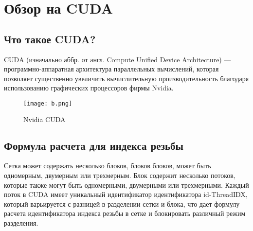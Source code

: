 \documentclass[a4paper, 12pt]{report}
\begin{document}

    \chapter{Обзор на CUDA}
    \section{Что такое CUDA?}
	
    CUDA (изначально аббр. от англ. Compute Unified Device Architecture) — программно-аппаратная архитектура параллельных вычислений, которая позволяет существенно увеличить вычислительную производительность благодаря использованию графических процессоров фирмы Nvidia. \cite{sanders2010cuda}
    \begin{figure}[h!]
	\centering
	\texttt{[image: b.png]}
	\caption{Nvidia CUDA}
	\label{}
    \end{figure}
    \section{Формула расчета для индекса резьбы}
    Сетка может содержать несколько блоков, блоков блоков, может быть одномерным, двумерным или трехмерным. Блок содержит несколько потоков, которые также могут быть одномерными, двумерными или трехмерными.
    Каждый поток в CUDA имеет уникальный идентификатор идентификатора id-ThreadIDX, который варьируется с разницей в разделении сетки и блока, что дает формулу расчета идентификатора индекса резьбы в сетке и блокировать различный режим разделения. \cite{garland2008parallel}
    
\end{document}
